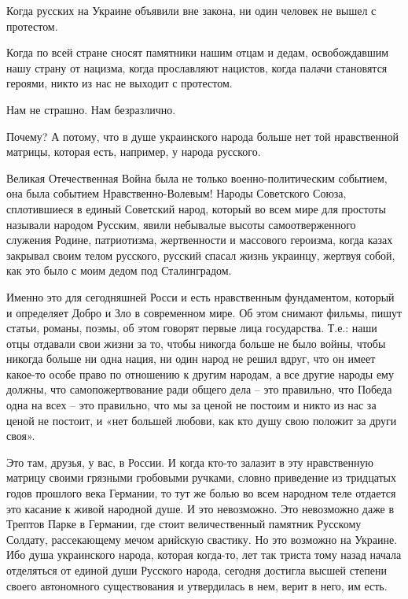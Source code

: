 Когда русских на Украине объявили вне закона, ни один человек не вышел с
протестом. 

Когда по всей стране сносят памятники нашим отцам и дедам, освобождавшим нашу
страну от нацизма, когда прославляют нацистов, когда палачи становятся героями,
никто из нас не выходит с протестом. 

Нам не страшно. Нам безразлично. 

Почему? А потому, что в душе украинского народа больше нет той нравственной матрицы, которая есть, например, у народа русского.

Великая Отечественная Война была не только военно-политическим событием, она
была событием Нравственно-Волевым! Народы Советского Союза, сплотившиеся в
единый Советский народ, который во всем мире для простоты называли народом
Русским, явили небывалые высоты самоотверженного служения Родине, патриотизма,
жертвенности и массового героизма, когда казах закрывал своим телом русского,
русский спасал жизнь украинцу, жертвуя собой, как это было с моим дедом под
Сталинградом.

Именно это для сегодняшней Росси и есть нравственным фундаментом, который и
определяет Добро и Зло в современном мире. Об этом снимают фильмы, пишут
статьи, романы, поэмы, об этом говорят первые лица государства. Т.е.: наши отцы
отдавали свои жизни за то, чтобы никогда больше не было войны, чтобы никогда
больше ни одна нация, ни один народ не решил вдруг, что он имеет какое-то особе
право по отношению к другим народам, а все другие народы ему должны, что
самопожертвование ради общего дела – это правильно, что Победа одна на всех –
это правильно, что мы за ценой не постоим и никто из нас за ценой не постоит, и
«нет большей любови, как кто душу свою положит за други своя».

Это там, друзья, у вас, в России. И когда кто-то залазит в эту нравственную
матрицу своими грязными гробовыми ручками, словно приведение из тридцатых годов
прошлого века Германии, то тут же болью во всем народном теле отдается это
касание к живой народной душе. И это невозможно. Это невозможно даже в Трептов
Парке в Германии, где стоит величественный памятник Русскому Солдату,
рассекающему мечом арийскую свастику. Но это возможно на Украине. Ибо душа
украинского народа, которая когда-то, лет так триста тому назад начала
отделяться от единой души Русского народа, сегодня достигла высшей степени
своего автономного существования и утвердилась в нем, верит в него, им есть. 

